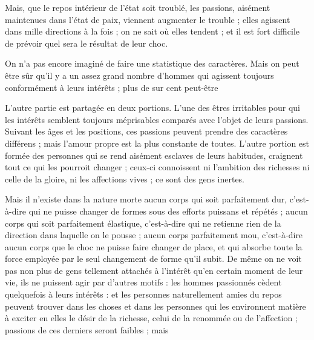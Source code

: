 \documentclass[11pt,a4paper]{article}
\begin{document}
 Mais, que le repos intérieur de l'état  soit
troublé, les passions, aisément maintenues dans l'état de paix, viennent
augmenter le trouble ; elles agissent dans mille directions à la fois ; on
ne sait où elles tendent ; et il est  fort difficile de prévoir
quel sera le résultat de leur choc.

On n'a pas encore imaginé de faire une statistique des caractères. Mais on
peut être sûr qu'il y a  un assez grand nombre d'hommes qui
agissent toujours conformément à leurs intérêts ; plus de \ill{} sur cent
peut-être

L'autre partie est partagée en deux portions. L'une  des
êtres irritables pour qui les intérêts semblent toujours méprisables
 comparés avec l'objet de leurs passions. Suivant
les âges et les positions,  ces passions peuvent prendre des caractères différens ; mais
l'amour propre est la plus constante de toutes.  L'autre
portion est  formée des personnes qui se rend
aisément esclaves de leurs habitudes, craignent tout ce qui les pourroit
changer ;  ceux-ci connoissent ni l'ambition des richesses
ni celle de la gloire, ni les affections vives ; ce sont des gens inertes.

Mais il n'existe dans la nature morte aucun corps qui
 soit parfaitement dur, c'est-à-dire qui ne puisse changer de
formes sous des efforts puissans et répétés ; aucun corps qui soit
parfaitement élastique, c'est-à-dire qui ne retienne rien de la direction
dans laquelle on le pousse ; aucun corps parfaitement mou, c'est-à-dire
aucun corps que le choc ne puisse faire changer de  place, et
qui absorbe toute la force employée par le seul changement de forme qu'il
subit\ill{}. De
même on ne voit pas non plus de
gens tellement attachés à l'intérêt qu'en certain moment de leur vie, ils ne
puissent agir par d'autres motifs :  les hommes
passionnés cèdent  quelquefois à leurs intérêts : et
les personnes naturellement amies du repos peuvent trouver dans les choses
et dans les personnes qui les environnent matière à exciter en
elles le désir de la richesse,
celui de la renommée ou de l'affection ;  passions de ces
derniers seront
faibles ; mais
\end{document}
